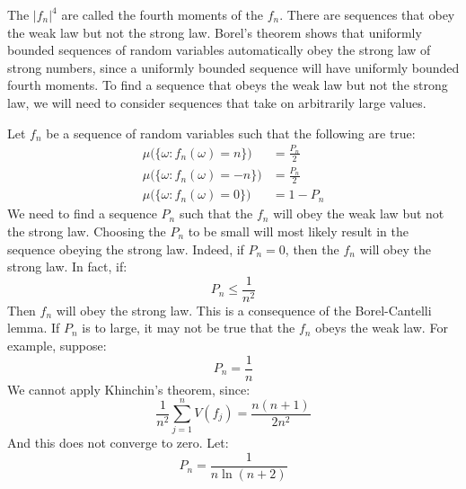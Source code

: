     The $|f_{n}|^{4}$ are called the fourth moments of the
    $f_{n}$. There are sequences that obey the weak law but
    not the strong law. Borel's theorem shows that uniformly
    bounded sequences of random variables automatically obey
    the strong law of strong numbers, since a uniformly
    bounded sequence will have uniformly bounded fourth
    moments. To find a sequence that obeys the weak law but
    not the strong law, we will need to consider sequences
    that take on arbitrarily large values.
    \begin{lexample}
        Let $f_{n}$ be a sequence of random variables such that
        the following are true:
        \begin{subequations}
            \begin{align}
                \mu\Big(\{\omega:f_{n}(\omega)=n\}\Big)
                &=\frac{P_{n}}{2}\\
                \mu\Big(\{\omega:f_{n}(\omega)=\minus{n}\}\Big)
                &=\frac{P_{n}}{2}\\
                \mu\Big(\{\omega:f_{n}(\omega)=0\}\Big)
                &=1-P_{n}
            \end{align}
        \end{subequations}
        We need to find a sequence $P_{n}$ such that the
        $f_{n}$ will obey the weak law but not the strong law.
        Choosing the $P_{n}$ to be small will most likely
        result in the sequence obeying the strong law. Indeed,
        if $P_{n}=0$, then the $f_{n}$ will obey the strong
        law. In fact, if:
        \begin{equation}
            P_{n}\leq\frac{1}{n^{2}}
        \end{equation}
        Then $f_{n}$ will obey the strong law. This is a
        consequence of the Borel-Cantelli lemma. If $P_{n}$
        is to large, it may not be true that the $f_{n}$ obeys
        the weak law. For example, suppose:
        \begin{equation}
            P_{n}=\frac{1}{n}
        \end{equation}
        We cannot apply Khinchin's theorem, since:
        \begin{equation}
            \frac{1}{n^{2}}\sum_{j=1}^{n}V(f_{j})=
            \frac{n(n+1)}{2n^{2}}
        \end{equation}
        And this does not converge to zero. Let:
        \begin{equation}
            P_{n}=\frac{1}{n\ln(n+2)}
        \end{equation}

\end{lexample}
